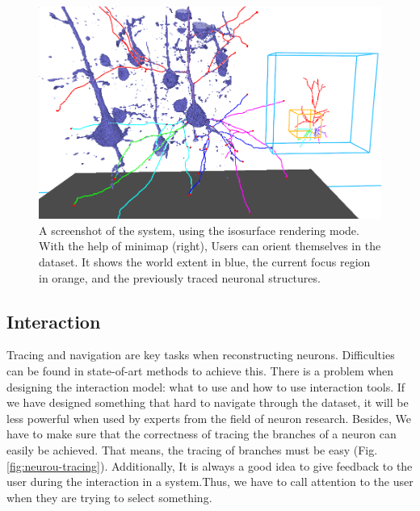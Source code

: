 \documentclass[10pt,twocolumn,letterpaper]{article}
\begin{document}
\begin{figure}[h]
\begin{center}
   \includegraphics[width=1.0\linewidth]{neuron-render.png}
\end{center}
   \caption{A screenshot of the system, using the isosurface rendering mode. With the help of minimap (right), Users can orient themselves in the dataset. It shows the world extent in blue, the current
focus region in orange, and the previously traced neuronal structures.}
\label{fig:neuron-render}
\end{figure}

\subsection{Interaction}
Tracing and navigation are key tasks when reconstructing neurons. Difficulties can be found in state-of-art methods to achieve this. There is a problem when designing the interaction model: what to use and how to use interaction tools. If we have designed something that hard to navigate through the dataset, it will be less powerful when used by experts from the field of neuron research. Besides, We have to make sure that the correctness of tracing the branches of a neuron can easily be achieved. That means, the tracing of branches must be easy (Fig. \ref{fig:neurou-tracing}). Additionally, It is always a good idea to give feedback to the user during the interaction in a system.Thus, we have to call attention to the user when they are trying to select something.
\end{document}
